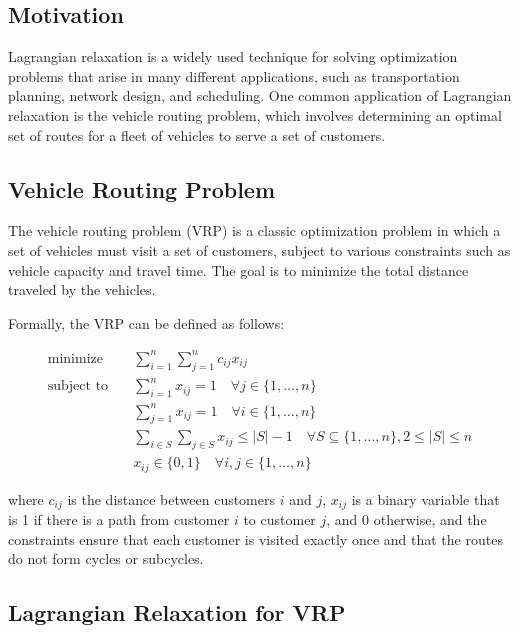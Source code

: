 
\subsection{Motivation}

Lagrangian relaxation is a widely used technique for solving optimization problems that arise in many different applications, such as transportation planning, network design, and scheduling. One common application of Lagrangian relaxation is the vehicle routing problem, which involves determining an optimal set of routes for a fleet of vehicles to serve a set of customers.

\subsection{Vehicle Routing Problem}

The vehicle routing problem (VRP) is a classic optimization problem in which a set of vehicles must visit a set of customers, subject to various constraints such as vehicle capacity and travel time. The goal is to minimize the total distance traveled by the vehicles.

Formally, the VRP can be defined as follows:

\begin{align*}
\text{minimize} \quad & \sum_{i=1}^n \sum_{j=1}^n c_{ij} x_{ij} \\
\text{subject to} \quad & \sum_{i=1}^n x_{ij} = 1 \quad \forall j \in \{1,\dots,n\} \\
& \sum_{j=1}^n x_{ij} = 1 \quad \forall i \in \{1,\dots,n\} \\
& \sum_{i \in S} \sum_{j \in S} x_{ij} \leq |S| - 1 \quad \forall S \subseteq \{1,\dots,n\}, 2 \leq |S| \leq n \\
& x_{ij} \in \{0,1\} \quad \forall i,j \in \{1,\dots,n\}
\end{align*}

where $c_{ij}$ is the distance between customers $i$ and $j$, $x_{ij}$ is a binary variable that is 1 if there is a path from customer $i$ to customer $j$, and 0 otherwise, and the constraints ensure that each customer is visited exactly once and that the routes do not form cycles or subcycles.

\subsection{Lagrangian Relaxation for VRP}

